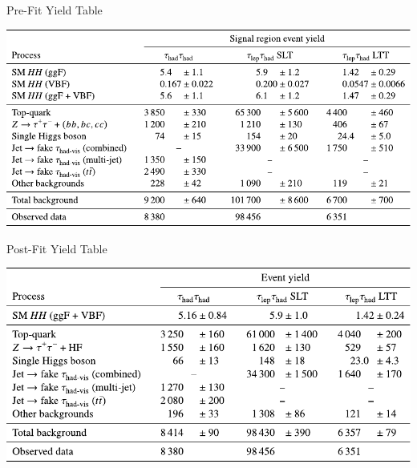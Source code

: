 \documentclass[11pt, xcolor={dvipsnames}, aspectratio=169]{beamer}
\begin{document}

\begin{frame}{Pre-Fit Yield Table}
  \centering

  \includegraphics[scale=0.9]{yieldtable_prefit}
\end{frame}


\begin{frame}{Post-Fit Yield Table}
  \centering

  \includegraphics[scale=0.9]{yieldtable_postfit}
\end{frame}

\end{document}
